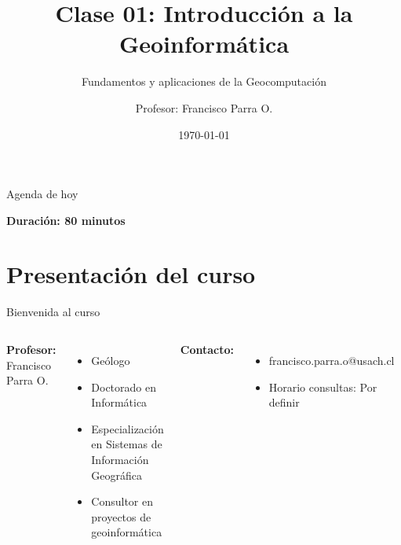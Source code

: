 \documentclass[10pt]{beamer}
\title{Clase 01: Introducción a la Geoinformática}
\subtitle{Fundamentos y aplicaciones de la Geocomputación}
\author{Profesor: Francisco Parra O.}
\institute{USACH - Ingeniería Civil en Informática}
\date{\today}
\begin{document}
\maketitle

\begin{frame}{Agenda de hoy}
    \tableofcontents
    
    \vspace{0.5cm}
    \begin{center}
        \textcolor{usachblue}{} \textbf{Duración: 80 minutos}
    \end{center}
\end{frame}

\section{Presentación del curso}

\begin{frame}{Bienvenida al curso}
    \begin{columns}
        \textbf{Profesor:} Francisco Parra O.
        \begin{itemize}
            \item Geólogo
            \item Doctorado en Informática
            \item Especialización en Sistemas de Información Geográfica
            \item Consultor en proyectos de geoinformática
        \end{itemize}
        
        \vspace{0.5cm}
        \textbf{Contacto:}
        \begin{itemize}
            \item {} francisco.parra.o@usach.cl
            \item {} Horario consultas: Por definir
        \end{itemize}
        
        \begin{center}
        \end{center}
    \end{columns}
\end{frame}
\end{document}
